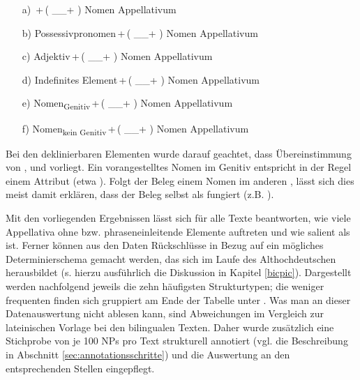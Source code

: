\begin{itemize}
\item [a)] \,+\,( \_\_+ )  Nomen Appellativum
\item [b)] Possessivpronomen\,+\,( \_\_+ )  Nomen Appellativum
\item [c)] Adjektiv\,+\,( \_\_+ )  Nomen Appellativum
\item [d)] Indefinites Element\,+\,( \_\_+ )   Nomen Appellativum
\item [e)] Nomen\textsubscript{Genitiv}\,+\,( \_\_+ )   Nomen Appellativum
\item [f)] Nomen\textsubscript{kein Genitiv}\,+\,( \_\_+ )   Nomen Appellativum
\end{itemize}

\noindent 
Bei den deklinierbaren Elementen wurde darauf geachtet, dass Übereinstimmung von ,  und  vorliegt. Ein vorangestelltes Nomen im Genitiv entspricht in der Regel einem Attribut  (etwa ). Folgt der Beleg einem Nomen im anderen , lässt sich dies meist damit erklären, dass  der Beleg selbst als  fungiert (z.B. ). 
 
Mit den vorliegenden Ergebnissen lässt sich für alle Texte beantworten, wie viele Appellativa  ohne  bzw. phraseneinleitende Elemente auftreten und wie salient  als  ist. Ferner können aus den Daten Rückschlüsse in Bezug auf ein mögliches  Determinierschema gemacht werden, das sich im Laufe des Althochdeutschen herausbildet (s. hierzu ausführlich die Diskussion in Kapitel \ref{bicpic}). Dargestellt werden nachfolgend jeweils die zehn häufigsten Strukturtypen; die weniger frequenten finden sich gruppiert am Ende der Tabelle unter .  Was man an dieser Datenauswertung  nicht ablesen kann, sind  Abweichungen im Vergleich zur lateinischen Vorlage bei den bilingualen Texten. Daher wurde zusätzlich eine Stichprobe von je 100 NPs pro Text strukturell annotiert (vgl. die Beschreibung in Abschnitt \ref{sec:annotationsschritte}) und die Auswertung an den entsprechenden Stellen eingepflegt.



